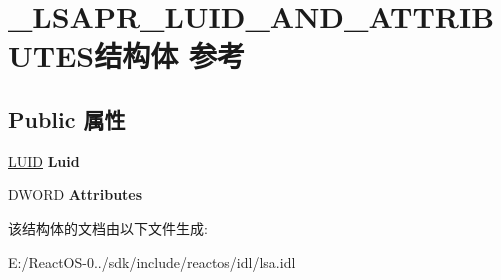 \hypertarget{struct___l_s_a_p_r___l_u_i_d___a_n_d___a_t_t_r_i_b_u_t_e_s}{}\section{\+\_\+\+L\+S\+A\+P\+R\+\_\+\+L\+U\+I\+D\+\_\+\+A\+N\+D\+\_\+\+A\+T\+T\+R\+I\+B\+U\+T\+E\+S结构体 参考}
\label{struct___l_s_a_p_r___l_u_i_d___a_n_d___a_t_t_r_i_b_u_t_e_s}
\subsection*{Public 属性}
\begin{DoxyCompactItemize}
\item 
\mbox{\label{struct___l_s_a_p_r___l_u_i_d___a_n_d___a_t_t_r_i_b_u_t_e_s_aa0fbe65ec85f620eed9ad4a887ab8311}} 
\hyperlink{struct___l_u_i_d}{L\+U\+ID} {\bfseries Luid}
\item 
\mbox{\label{struct___l_s_a_p_r___l_u_i_d___a_n_d___a_t_t_r_i_b_u_t_e_s_aba4e3d7de6f2c0b7ce2195d226e38416}} 
D\+W\+O\+RD {\bfseries Attributes}
\end{DoxyCompactItemize}


该结构体的文档由以下文件生成\+:\begin{DoxyCompactItemize}
\item 
E\+:/\+React\+O\+S-\/0../sdk/include/reactos/idl/lsa.\+idl\end{DoxyCompactItemize}
